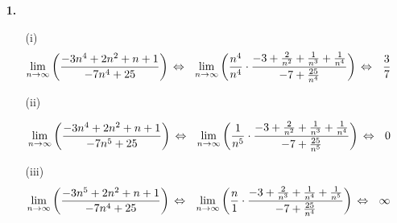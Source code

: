 \documentclass [a4paper,12pt]{article}
\author{\authorinfotitle}
\title{\titleinfo}
\date{\today}
\begin{document}
\maketitle
    \begin{enumerate}
        \item[\textbf{1.}]
            \begin{enumerate}
                \item[(i)]
                        $$\limp
                        \left( \frac{-3n^4+2n^2+n+1}{-7n^4+25} \right) \\
                        \Leftrightarrow \ \ \limp
                        \left( \frac{n^4}{n^4} \cdot \frac{-3+ \frac{2}{n^2} + \frac{1}{n^3} + \frac{1}{n^4}}{-7+ \frac{25}{n^4}} \right) \\
                        \Leftrightarrow \ \ \frac{3}{7}$$
                \item[(ii)]
                    
                        $$\underset{n \to \infty}{\lim}
                        \left( \frac{-3n^4+2n^2+n+1}{-7n^5+25} \right) \\
                        \Leftrightarrow \  \ \underset{n \to \infty}{\lim}
                        \left( \frac{1}{n^5} \cdot \frac{-3+ \frac{2}{n^2} + \frac{1}{n^3} + \frac{1}{n^4}}{-7+ \frac{25}{n^5}} \right) \\
                        \Leftrightarrow \ \ 0$$
                \item[(iii)]
                        $$\underset{n \to \infty}{\lim}
                        \left( \frac{-3n^5+2n^2+n+1}{-7n^4+25} \right) \\
                        \Leftrightarrow \ \  \underset{n \to \infty}{\lim}
                        \left( \frac{n}{1} \cdot \frac{-3+ \frac{2}{n^3} + \frac{1}{n^4} + \frac{1}{n^5}}{-7+ \frac{25}{n^4}} \right) \\
                        \Leftrightarrow \ \ \infty$$
                   

\end{enumerate}
\end{enumerate}
\end{document}
